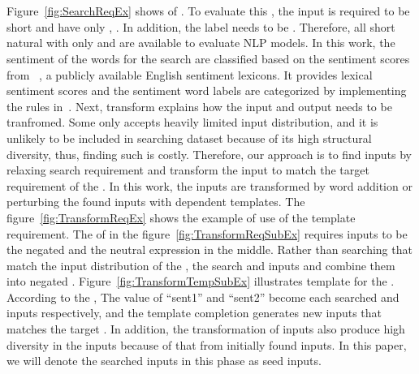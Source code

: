 \begin{figure}[t]
  \centering
  
  \vspace{-10pt}
  \caption{\SearchRequirementExampleFigCaption}
  \vspace{-10pt}
\end{figure}

\begin{figure}[t]
  \centering
  \subfloat[][\TransformRequirementExampleSubFigCaption]{}
  \\
  \subfloat[][\TransformTemplateExampleSubFigCaption]{}
  \\
  \caption{\TransformRequirementExampleFigCaption}
  \vspace{-10pt}
\end{figure}

Figure~\ref{fig:SearchReqEx} shows \lc of \SareqExOne. To evaluate
this \lc, the input is required to be short and have only \neu \adjs,
\neu \nns. In addition, the label needs to be \neu. Therefore, all
short natural \sents with only \neu \adjs and \neu \nns are available
to evaluate NLP models. In this work, the sentiment of the words for
the search are classified based on the sentiment scores from
\Swn~\cite{baccianella2010sentiwordnet}, a publicly available English
sentiment lexicons.  It provides lexical sentiment scores and the
sentiment word labels are categorized by implementing the rules
in~\cite{mihaela2017sentiwordnetlabel}. Next, transform \req explains
how the input and output needs to be tranfromed. Some \lc only accepts
heavily limited input distribution, and it is unlikely to be included
in searching dataset because of its high structural diversity, thus,
finding such \sents is costly. Therefore, our approach is to find
inputs by relaxing search requirement and transform the input to match
the target requirement of the \lc. In this work, the inputs are
transformed by word addition or perturbing the found inputs with \lc
dependent templates. The figure~\ref{fig:TransformReqEx} shows the
example of use of the template requirement. The \lc of \SareqExTwo in
the figure~\ref{fig:TransformReqSubEx} requires inputs to be the
negated \pstv \sents and the neutral expression in the middle. Rather
than searching \sents that match the input distribution of the \lc,
the \Model search \pstv and \neu inputs and combine them into negated
\pstv \sents. Figure~\ref{fig:TransformTempSubEx} illustrates template
for the \lc. According to the \lc, The value of ``sent1'' and
``sent2'' become each searched \neu and \pstv inputs respectively, and
the template completion generates new inputs that matches the target
\lc. In addition, the transformation of inputs also produce high
diversity in the inputs because of that from initially found
inputs. In this paper, we will denote the searched inputs in this
phase as seed inputs.

